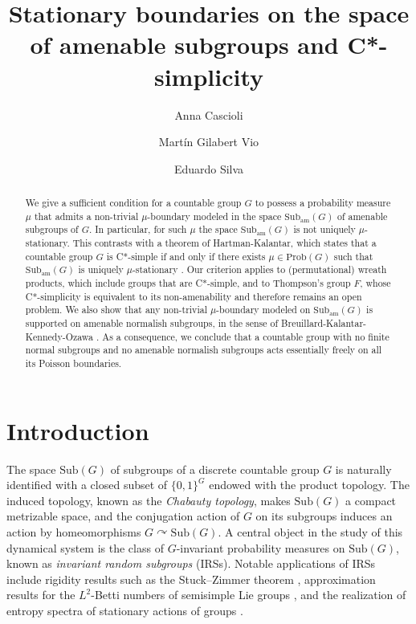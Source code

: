 \documentclass[reqno,a4paper,11pt]{amsart}
\author{Anna Cascioli}
\author{Martín Gilabert Vio}
\author{Eduardo Silva}
\title{Stationary boundaries on the space of amenable subgroups and C*-simplicity}
\numberwithin{equation}{section}
\newcommand{\1}{\mathbf{1}}
\newcommand{\sub}[1]{\mathrm{Sub}(#1)}
\theoremstyle{definition}
\begin{document}
	
	\begin{abstract}
		We give a sufficient condition for a countable group $G$ to possess a probability measure $\mu$ that admits a non-trivial $\mu$-boundary modeled in the space $\mathrm{Sub}_{\mathrm{am}}(G)$ of amenable subgroups of $G$. In particular, for such $\mu$ the space $\mathrm{Sub}_{\mathrm{am}}(G)$ is not uniquely $\mu$-stationary. This contrasts with a theorem of Hartman-Kalantar, which states that a countable group $G$ is C*-simple if and only if there exists $\mu\in \mathrm{Prob}(G)$ such that $\mathrm{Sub}_{\mathrm{am}}(G)$ is uniquely $\mu$-stationary \cite{HartmanKalantar2022}. Our criterion applies to (permutational) wreath products, which include groups that are C*-simple, and to Thompson's group $F$, whose C*-simplicity is equivalent to its non-amenability and therefore remains an open problem. We also show that any non-trivial $\mu$-boundary modeled on $\mathrm{Sub}_{\mathrm{am}}(G)$ is supported on amenable normalish subgroups, in the sense of Breuillard-Kalantar-Kennedy-Ozawa \cite{BreuillardKalantarKennedyOzawa2017}. As a consequence, we conclude that a countable group with no finite normal subgroups and no amenable normalish subgroups acts essentially freely on all its Poisson boundaries.
		
	\end{abstract}
	
	\maketitle
	
\section{Introduction}
The space $\sub{G}$ of subgroups of a discrete countable group $G$ is naturally identified with a closed subset of $\{0,1\}^G$ endowed with the product topology. The induced topology, known as the \emph{Chabauty topology}, makes $\sub{G}$ a compact metrizable space, and the conjugation action of $G$ on its subgroups induces an action by homeomorphisms $G \curvearrowright \sub{G}$. A central object in the study of this dynamical system is the class of $G$-invariant probability measures on $\sub{G}$, known as \emph{invariant random subgroups} (IRSs). Notable applications of IRSs include rigidity results such as the Stuck--Zimmer theorem \cite{StuckZimmer}, approximation results for the $L^2$-Betti numbers of semisimple Lie groups \cite{7samurai}, and the realization of entropy spectra of stationary actions of groups \cite{Bowen2015,HartmanYadin2018}.
\end{document}
